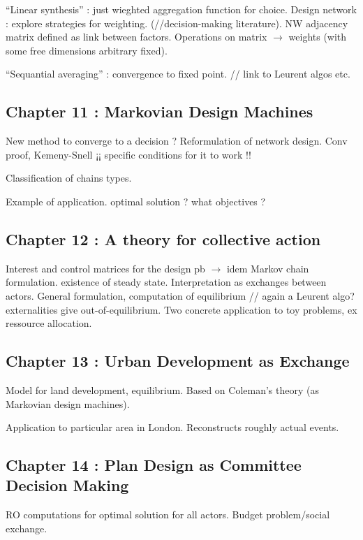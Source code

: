 ``Linear synthesis'' : just wieghted aggregation function for choice. Design network : explore strategies for weighting. (//decision-making literature). NW adjacency matrix defined as link between factors. Operations on matrix $\rightarrow$ weights (with some free dimensions arbitrary fixed).

``Sequantial averaging'' : convergence to fixed point. // link to Leurent algos etc.

\subsection{Chapter 11 : Markovian Design Machines}

New method to converge to a decision ? Reformulation of network design. Conv proof, Kemeny-Snell ¡¡ specific conditions for it to work !!

Classification of chains types.

Example of application. optimal solution ? what objectives ?



\subsection{Chapter 12 : A theory for collective action}

Interest and control matrices for the design pb $\rightarrow$ idem Markov chain formulation. existence of steady state. Interpretation as exchanges between actors. General formulation, computation of equilibrium // again a Leurent algo? externalities give out-of-equilibrium. Two concrete application to toy problems, ex ressource allocation.

\subsection{Chapter 13 : Urban Development as Exchange}

Model for land development, equilibrium. Based on Coleman's theory (as Markovian design machines).

Application to particular area in London. Reconstructs roughly actual events.

\subsection{Chapter 14 : Plan Design as Committee Decision Making}

RO computations for optimal solution for all actors. Budget problem/social exchange.


